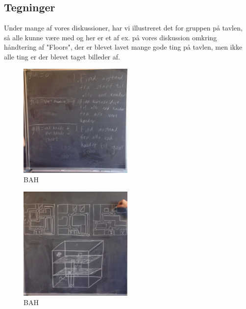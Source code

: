 \documentclass[a4paper,12pt, article]{memoir}
\begin{document}
        \subsection{Tegninger}
        Under mange af vores diskussioner, har vi illustreret det for gruppen på tavlen, så alle kunne være  med og her er et af ex. på vores diskussion omkring håndtering af "Floors", der er blevet lavet mange gode ting på tavlen, men ikke alle ting er der blevet taget billeder af.

        \begin{figure}[ht!]
            \centering
            \includegraphics[width=0.5\textwidth]{Images/5.jpg}
            \caption{BAH}
            \label{4}
        \end{figure}

        \begin{figure}[ht!]
            \centering
            \includegraphics[width=0.5\textwidth]{Images/6.jpg}
            \caption{BAH}
            \label{4}
        \end{figure}
\end{document}
